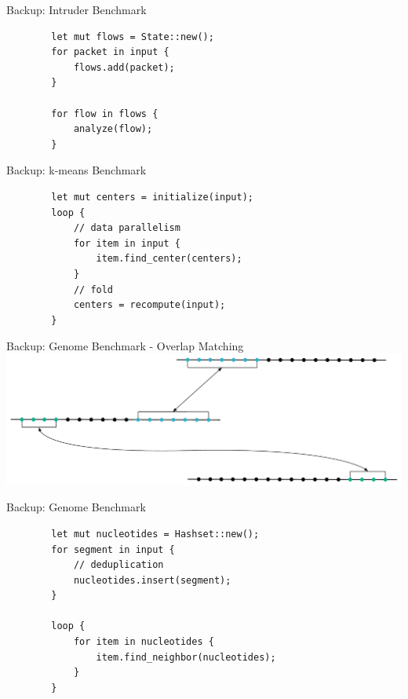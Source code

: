 \documentclass[aspectratio=169, usenames, dvipsnames]{beamer}
\begin{document}
\begin{frame}[fragile]{Backup: Intruder Benchmark}
    \centering
    \begin{verbatim}
        let mut flows = State::new();
        for packet in input {
            flows.add(packet);
        }

        for flow in flows {
            analyze(flow);
        }
    \end{verbatim}
\end{frame}

\begin{frame}[fragile]{Backup: k-means Benchmark}
    \centering
    \begin{verbatim}
        let mut centers = initialize(input);
        loop {
            // data parallelism
            for item in input {
                item.find_center(centers);
            }
            // fold
            centers = recompute(input);
        }
    \end{verbatim}
\end{frame}

\begin{frame}{Backup: Genome Benchmark - Overlap Matching}
    \centering
    \includegraphics[width=\textwidth,keepaspectratio]{img/experiments-genome}
\end{frame}

\begin{frame}[fragile]{Backup: Genome Benchmark}
    \centering
    \begin{verbatim}
        let mut nucleotides = Hashset::new();
        for segment in input {
            // deduplication
            nucleotides.insert(segment);
        }

        loop {
            for item in nucleotides {
                item.find_neighbor(nucleotides);
            }
        }
    \end{verbatim}
\end{frame}
\end{document}
